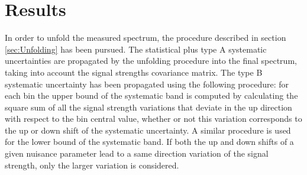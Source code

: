 \section{Results}
\label{sec:Results}

In order to unfold the measured spectrum, the procedure described in section \ref{sec:Unfolding} has been pursued.
The statistical plus type A systematic uncertainties are propagated by the unfolding procedure into the final spectrum, taking into account the signal strengths covariance matrix. The type B systematic uncertainty has been propagated using the following procedure: for each \pth bin the upper bound of the systematic band is computed by calculating the square sum of all the signal strength variations that deviate in the up direction with respect to the bin central value, whether or not this variation corresponds to the up or down shift of the systematic uncertainty. A similar procedure is used for the lower bound of the systematic band. If both the up and down shifts of a given nuisance parameter lead to a same direction variation of the signal strength, only the larger variation is considered.

